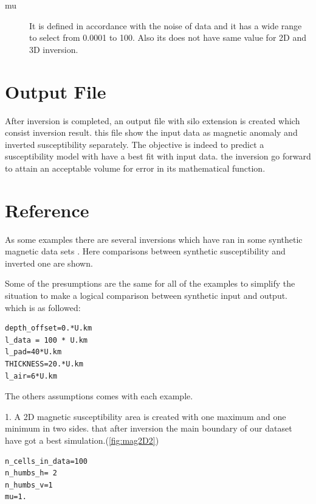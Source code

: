 \begin{description} 	

\item[mu]
It is defined in accordance with the noise of data and it has a wide range to select from 0.0001 to 100. Also its does not have same value for 2D and 3D inversion.

\end{description}

\section{Output File}

After inversion is completed, an output file with silo extension is created which consist inversion result. this file show the input data as magnetic anomaly and inverted susceptibility separately. The objective is indeed to  predict a susceptibility model with have a best fit with input data. the inversion go forward to attain an acceptable volume for error in its mathematical function. 


\section{Reference}

As some examples there are several inversions which have ran in some synthetic magnetic data sets . Here comparisons between synthetic susceptibility and inverted one are shown.

Some of the presumptions are the same for all of the examples to simplify the situation to make a logical comparison between synthetic input and output. which is as followed:

\begin{verbatim}
depth_offset=0.*U.km
l_data = 100 * U.km
l_pad=40*U.km
THICKNESS=20.*U.km
l_air=6*U.km
\end{verbatim}

The others assumptions comes with each example.

1. A 2D magnetic susceptibility area is created with one maximum and one minimum in two sides. that after inversion the main boundary of our dataset  have got a best simulation.(\ref{fig:mag2D2}) 

\begin{verbatim}
n_cells_in_data=100
n_humbs_h= 2
n_humbs_v=1
mu=1.
\end{verbatim}

